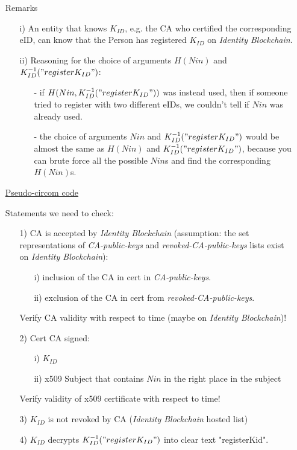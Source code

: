 \documentclass{article}
\newcommand{\kid}{K_{ID}}
\newcommand{\pbc}{\textit{Identity Blockchain}}
\begin{document}
\begin{enumerate}[leftmargin=0cm]
\item[] Remarks
\begin{itemize}
\item[i)] An entity that knows $\kid$, e.g. the CA who certified the corresponding eID, can know that the Person has registered $\kid$ on \pbc{}.
\item[ii)] Reasoning for the choice of arguments $H(Nin)$ and $\kid^{-1}("register\kid")$: 
\begin{itemize}
	\item[-] if $H(Nin, \kid^{-1}("register\kid"))$ was instead used, then if someone tried to register with two different eIDs, we couldn't tell if $Nin$ was already used. 
	\item[-] the choice of arguments $Nin$ and $\kid^{-1}("register\kid")$ would be almost the same as $H(Nin)$ and $\kid^{-1}("register\kid")$, because you can brute force all the possible $Nin$s and find the corresponding $H(Nin)$s.
\end{itemize}
\end{itemize}

\item[] \underline{Pseudo-circom code}

Statements we need to check:
\begin{itemize}
	\item[1)] CA is accepted by \pbc{} (assumption: the set representations of \textit{CA-public-keys} and \textit{revoked-CA-public-keys} lists exist on \pbc{}):
		\begin{itemize}
			\item[i)] inclusion of the CA in cert in \textit{CA-public-keys}.
			\item[ii)] exclusion of the CA in cert from \textit{revoked-CA-public-keys}.
		\end{itemize}
		Verify CA validity with respect to time (maybe on \pbc{})!
	\item[2)] Cert CA signed: 
		\begin{itemize}
			\item[i)] $\kid$
			\item[ii)] x509 Subject that contains $Nin$ in the right place in the subject
		\end{itemize}
		Verify validity of x509 certificate with respect to time!
		\item[3)] $\kid$ is not revoked by CA (\pbc{} hosted list)
	\item[4)] $\kid$ decrypts $\kid^{-1}("register\kid")$ into clear text "registerKid".
\end{itemize}


\end{enumerate}
\end{document}
